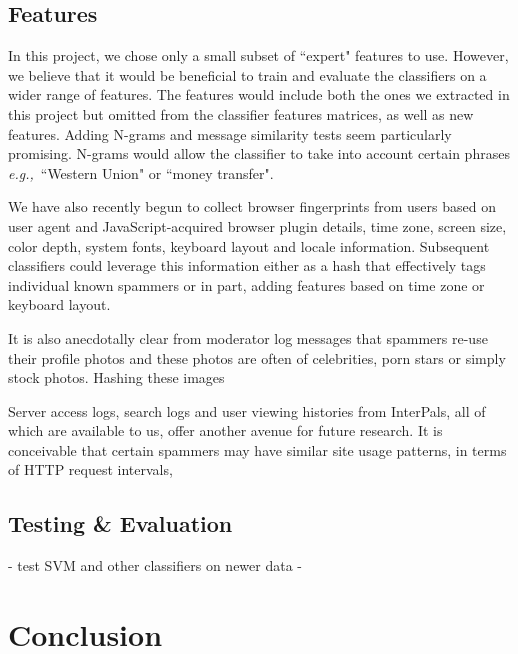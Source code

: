 \documentclass[preprint]{acm_proc_article-sp}
\newcommand{\eg}{{\em e.g.,}~}
\begin{document}
\subsection{Features}

In this project, we chose only a small subset of ``expert" features to use. However, we believe that it would be beneficial to train and evaluate the classifiers on a wider range of features. The features would include both the ones we extracted in this project but omitted from the classifier features matrices, as well as new features. Adding N-grams and message similarity tests seem particularly promising. N-grams would allow the classifier to take into account certain phrases \eg{``Western Union" or ``money transfer"}. 

We have also recently begun to collect browser fingerprints from users based on user agent and JavaScript-acquired browser plugin details, time zone, screen size, color depth, system fonts, keyboard layout and locale information. Subsequent classifiers could leverage this information either as a hash that effectively tags individual known spammers or in part, adding features based on time zone or keyboard layout.

It is also anecdotally clear from moderator log messages that spammers re-use their profile photos and these photos are often of celebrities, porn stars or simply stock photos. Hashing these images 


Server access logs, search logs and user viewing histories from InterPals, all of which are available to us, offer another avenue for future research. It is conceivable that certain spammers may have similar site usage patterns, in terms of HTTP request intervals, 


\subsection{Testing \& Evaluation}

- test SVM and other classifiers on newer data
- 

\section{Conclusion}
\end{document}

